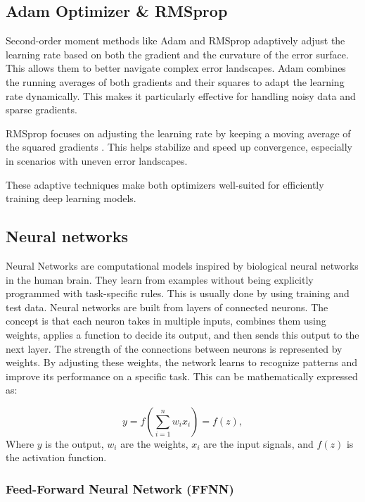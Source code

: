 \documentclass{article}
\newcommand{\0}{\mathbf{0}}
\newcommand{\1}{\mathbf{1}}
\begin{document}
\subsection{Adam Optimizer \& RMSprop}

Second-order moment methods like Adam and RMSprop adaptively adjust the learning rate based on both the gradient and the curvature of the error surface. This allows them to better navigate complex error landscapes.
Adam combines the running averages of both gradients and their squares to adapt the learning rate dynamically. This makes it particularly effective for handling noisy data and sparse gradients.

RMSprop focuses on adjusting the learning rate by keeping a moving average of the squared gradients \cite{uke39}. This helps stabilize and speed up convergence, especially in scenarios with uneven error landscapes. 

These adaptive techniques make both optimizers well-suited for efficiently training deep learning models.



\subsection{Neural networks}

Neural Networks are computational models inspired by biological neural networks in the human brain. They learn from examples without being explicitly programmed with task-specific rules. This is usually done by using training and test data.  Neural networks are built from layers of connected neurons. The concept is that each neuron takes in multiple inputs, combines them using weights, applies a function to decide its output, and then sends this output to the next layer. The strength of the connections between neurons is represented by weights. By adjusting these weights, the network learns to recognize patterns and improve its performance on a specific task. This can be mathematically expressed as: 


\begin{equation}
     y = f\left(\sum_{i=1}^{n} w_i x_i\right) = f(z), 
     \label{neural1}
\end{equation}
Where \( y \) is the output, \( w_i \) are the weights, \( x_i \) are the input signals, and \( f(z) \) is the activation function.





\subsubsection{Feed-Forward Neural Network (FFNN)}
\end{document}
